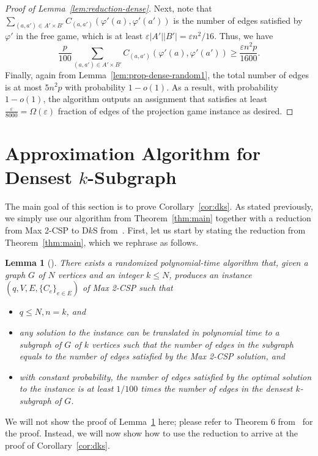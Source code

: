 \documentclass{article}
\newtheorem{lemma}{Lemma}
\begin{document}
\begin{proof}[Proof of Lemma~\ref{lem:reduction-dense}]
Next, note that $\sum_{(a, a') \in A' \times B'} C_{(a, a')}(\varphi'(a), \varphi'(a'))$ is the number of edges satisfied by $\varphi'$ in the free game, which is at least $\varepsilon |A'||B'| = \varepsilon n^2/16$. Thus, we have
$$  \frac{p}{100} \sum_{(a, a') \in A' \times B'} C_{(a, a')}(\varphi'(a), \varphi'(a')) \geq \frac{\varepsilon n^2p}{1600}.$$
Finally, again from Lemma~\ref{lem:prop-dense-random1}, the total number of edges is at most $5n^2p$ with probability $1 - o(1)$. As a result, with probability $1 - o(1)$, the algorithm outputs an assignment that satisfies at least $\frac{\varepsilon}{8000} = \Omega(\varepsilon)$ fraction of edges of the projection game instance as desired.
\end{proof}

\section{Approximation Algorithm for Densest $k$-Subgraph}

The main goal of this section is to prove Corollary~\ref{cor:dks}. As stated previously, we simply use our algorithm from Theorem~\ref{thm:main} together with a reduction from {\sc Max 2-CSP} to {\sc D$k$S} from~\cite{CHK}. First, let us start by stating the reduction from Theorem~\ref{thm:main}, which we rephrase as follows. \\

\begin{lemma}[\cite{CHK}] \label{lem:dks-reduction}
  There exists a randomized polynomial-time algorithm that, given a graph $G$ of $N$ vertices and an integer $k \leq N$, produces an instance $(q, V, E, \{C_e\}_{e \in E})$ of {\sc Max 2-CSP} such that
  \begin{itemize}
  \item $q \leq N, n = k$, and
  \item any solution to the instance can be translated in polynomial time to a subgraph of $G$ of $k$ vertices such that the number of edges in the subgraph equals to the number of edges satisfied by the {\sc Max 2-CSP} solution, and
  \item with constant probability, the number of edges satisfied by the optimal solution to the instance is at least $1/100$ times the number of edges in the densest $k$-subgraph of $G$.
  \end{itemize}
\end{lemma}

We will not show the proof of Lemma~\ref{lem:dks-reduction} here; please refer to Theorem 6 from~\cite{CHK} for the proof. Instead, we will now show how to use the reduction to arrive at the proof of Corollary~\ref{cor:dks}.
\end{document}

